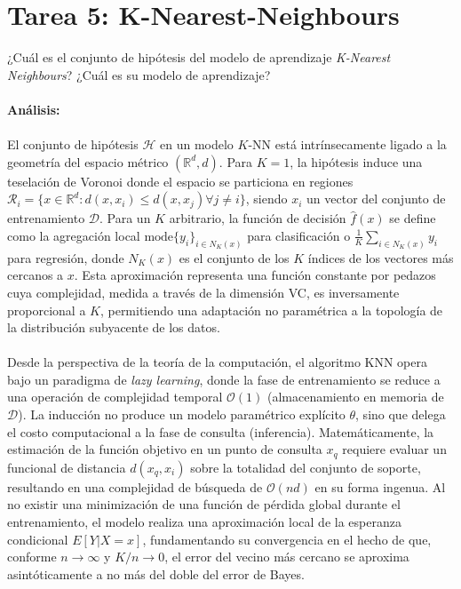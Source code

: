\documentclass{article}
\begin{document}
\section{Tarea 5: K-Nearest-Neighbours}
\noindent ¿Cuál es el conjunto de hipótesis del modelo de aprendizaje \textit{K-Nearest Neighbours}? ¿Cuál es su modelo de aprendizaje? \\ \\
\textbf{Análisis:} \\ \\
El conjunto de hipótesis $\mathcal{H}$ en un modelo $K$-NN está intrínsecamente ligado a la geometría del espacio métrico $(\mathbb{R}^d, d)$. Para $K=1$, la hipótesis induce una teselación de Voronoi donde el espacio se particiona en regiones $\mathcal{R}_i = \{x \in \mathbb{R}^d : d(x, x_i) \leq d(x, x_j) \forall j \neq i\}$, siendo $x_i$ un vector del conjunto de entrenamiento $\mathcal{D}$. Para un $K$ arbitrario, la función de decisión $\hat{f}(x)$ se define como la agregación local $\text{mode}\{y_i\}_{i \in N_K(x)}$ para clasificación o $\frac{1}{K} \sum_{i \in N_K(x)} y_i$ para regresión, donde $N_K(x)$ es el conjunto de los $K$ índices de los vectores más cercanos a $x$. Esta aproximación representa una función constante por pedazos cuya complejidad, medida a través de la dimensión VC, es inversamente proporcional a $K$, permitiendo una adaptación no paramétrica a la topología de la distribución subyacente de los datos. \\ \\
Desde la perspectiva de la teoría de la computación, el algoritmo KNN opera bajo un paradigma de \textit{lazy learning}, donde la fase de entrenamiento se reduce a una operación de complejidad temporal $\mathcal{O}(1)$ (almacenamiento en memoria de $\mathcal{D}$). La inducción no produce un modelo paramétrico explícito $\theta$, sino que delega el costo computacional a la fase de consulta (inferencia). Matemáticamente, la estimación de la función objetivo en un punto de consulta $x_q$ requiere evaluar un funcional de distancia $d(x_q, x_i)$ sobre la totalidad del conjunto de soporte, resultando en una complejidad de búsqueda de $\mathcal{O}(nd)$ en su forma ingenua. Al no existir una minimización de una función de pérdida global durante el entrenamiento, el modelo realiza una aproximación local de la esperanza condicional $E[Y|X=x]$, fundamentando su convergencia en el hecho de que, conforme $n \to \infty$ y $K/n \to 0$, el error del vecino más cercano se aproxima asintóticamente a no más del doble del error de Bayes.
\end{document}
